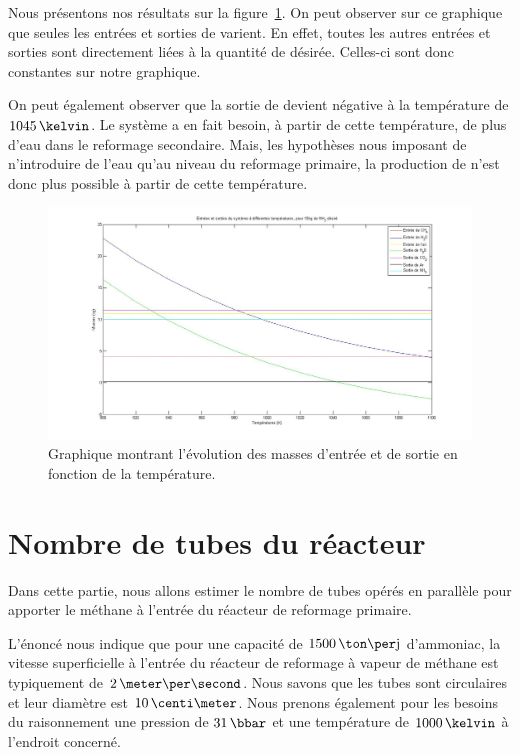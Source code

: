 Nous présentons nos résultats sur la figure~\ref{fig:graphe}. On peut observer sur ce graphique que seules les entrées et sorties de
 varient.
En effet, toutes les autres entrées et sorties sont directement
liées à la quantité de  désirée.
Celles-ci sont donc constantes sur notre graphique.

On peut également observer que la sortie de  devient négative
à la température de $1045\,\kelvin$.
Le système a en fait besoin, à partir de cette température,
de plus d'eau dans le reformage secondaire. Mais, les hypothèses nous imposant de n'introduire de l'eau qu'au niveau du reformage primaire, la production de  n'est donc plus possible à partir de cette température.

\begin{figure}
\begin{center}
\includegraphics[width=\textwidth]{img/graphe1}
\caption{Graphique montrant l'évolution des masses d'entrée et de sortie en fonction de la température.}
\label{fig:graphe}
\end{center}
\end{figure}

\section{Nombre de tubes du réacteur}

Dans cette partie, nous allons estimer le nombre de tubes opérés
en parallèle pour apporter le méthane à l'entrée du réacteur de reformage primaire.

L’énoncé nous indique que pour une capacité de $1500\,\ton\per\jour$ d’ammoniac,
la vitesse superficielle à l’entrée du réacteur de reformage
à vapeur de méthane est typiquement de $2\,\meter\per\second$.
Nous savons que les tubes sont circulaires et leur diamètre est $10\,\centi\meter$.
Nous prenons également pour les besoins du raisonnement
une pression de $31\,\bbar$ et une température de $1000\,\kelvin$
à l'endroit concerné.

